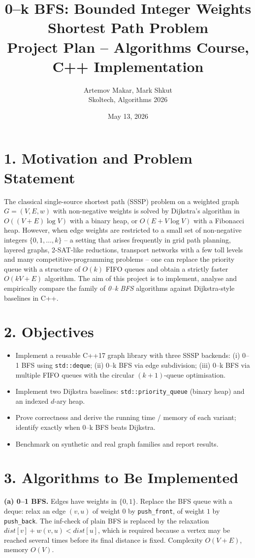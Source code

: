 \documentclass[11pt,a4paper]{article}
\title{\vspace{-2.2em}\textbf{0--k BFS: Bounded Integer Weights Shortest Path Problem}\\
\large Project Plan -- Algorithms Course, C++ Implementation}
\author{Artemov Makar, Mark Shkut \\ Skoltech, Algorithms 2026}
\date{May 13, 2026}
\begin{document}
\maketitle
\vspace{-1.5em}

\section*{1. Motivation and Problem Statement}
The classical single-source shortest path (SSSP) problem on a weighted graph
$G=(V,E,w)$ with non-negative weights is solved by Dijkstra's algorithm in
$O((V+E)\log V)$ with a binary heap, or $O(E + V\log V)$ with a Fibonacci heap.
However, when edge weights are restricted to a small set of non-negative
integers $\{0,1,\dots,k\}$ -- a setting that arises frequently in grid path
planning, layered graphs, 2-SAT-like reductions, transport networks with a few
toll levels and many competitive-programming problems -- one can replace the
priority queue with a structure of $O(k)$ FIFO queues and obtain a strictly
faster $O(kV+E)$ algorithm. The aim of this project is to implement, analyse
and empirically compare the family of \emph{0--k BFS} algorithms against
Dijkstra-style baselines in C++.

\section*{2. Objectives}
\begin{itemize}[leftmargin=1.4em,itemsep=0.1em,topsep=0.1em]
    \item Implement a reusable C++17 graph library with three SSSP backends:
          (i) 0--1 BFS using \texttt{std::deque}; (ii) 0--k BFS via edge
          subdivision; (iii) 0--k BFS via multiple FIFO queues with the
          circular $(k{+}1)$-queue optimisation.
    \item Implement two Dijkstra baselines: \texttt{std::priority\_queue} (binary
          heap) and an indexed $d$-ary heap.
    \item Prove correctness and derive the running time / memory of each
          variant; identify exactly when 0--k BFS beats Dijkstra.
    \item Benchmark on synthetic and real graph families and report results.
\end{itemize}

\section*{3. Algorithms to Be Implemented}
\textbf{(a) 0--1 BFS.} Edges have weights in $\{0,1\}$. Replace the BFS queue
with a deque: relax an edge $(v,u)$ of weight $0$ by \texttt{push\_front}, of
weight $1$ by \texttt{push\_back}. The inf-check of plain BFS is replaced by
the relaxation $dist[v]+w(v,u)<dist[u]$, which is required because a vertex
may be reached several times before its final distance is fixed. Complexity
$O(V+E)$, memory $O(V)$.
\end{document}
